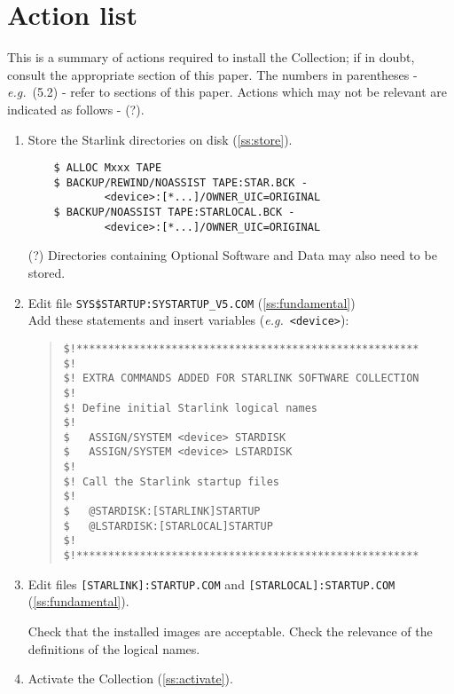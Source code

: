 \newpage

\section{Action list}
\label{se:actions}

This is a summary of actions required to install the Collection; if in doubt,
consult the appropriate section of this paper. The numbers in parentheses -
{\em e.g.}\ (5.2) - refer to sections of this paper. Actions which may not be
relevant are indicated as follows - (?).

\begin{enumerate}

\item Store the Starlink directories on disk (\ref{ss:store}).

\begin{verbatim}
    $ ALLOC Mxxx TAPE
    $ BACKUP/REWIND/NOASSIST TAPE:STAR.BCK -
            <device>:[*...]/OWNER_UIC=ORIGINAL
    $ BACKUP/NOASSIST TAPE:STARLOCAL.BCK -
            <device>:[*...]/OWNER_UIC=ORIGINAL
\end{verbatim}

(?) Directories containing Optional Software and Data may also need to be
stored.

\item Edit file {\tt SYS\$STARTUP:SYSTARTUP\_V5.COM} (\ref{ss:fundamental})\\
Add these statements and insert variables ({\em e.g.}\ \verb+<device>+):

\begin{quote}\small
\begin{verbatim}
$!******************************************************
$!
$! EXTRA COMMANDS ADDED FOR STARLINK SOFTWARE COLLECTION
$!
$! Define initial Starlink logical names
$!
$	ASSIGN/SYSTEM <device> STARDISK
$	ASSIGN/SYSTEM <device> LSTARDISK
$!
$! Call the Starlink startup files
$!
$	@STARDISK:[STARLINK]STARTUP
$	@LSTARDISK:[STARLOCAL]STARTUP
$!
$!******************************************************
\end{verbatim}
\end{quote}

\item Edit files {\tt [STARLINK]:STARTUP.COM} and {\tt [STARLOCAL]:STARTUP.COM}
(\ref{ss:fundamental}).

Check that the installed images are acceptable. Check the relevance of the
definitions of the logical names.

\item Activate the Collection (\ref{ss:activate}).


\end{enumerate}
